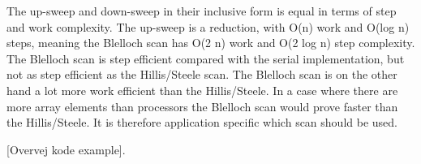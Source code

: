 The up-sweep and down-sweep in their inclusive form is equal in terms of step and work complexity. The up-sweep is a reduction, with O(n) work and O(log n) steps, meaning the Blelloch scan has O(2 n) work and O(2 log n) step complexity. The Blelloch scan is step efficient compared with the serial implementation, but not as step efficient as the Hillis/Steele scan. The Blelloch scan is on the other hand a lot more work efficient than the Hillis/Steele. In a case where there are more array elements than processors the Blelloch scan would prove faster than the Hillis/Steele. It is therefore application specific which scan should be used.

[Overvej kode example].